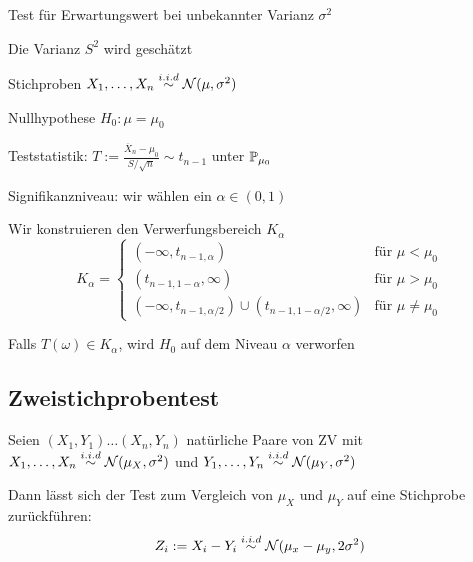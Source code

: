 \begin{definition}[t-Test] Test für Erwartungswert bei unbekannter Varianz \(\sigma^2\)

	Die Varianz \(S^2\) wird geschätzt
	\begin{compactenum}
		\item Stichproben \(X_1, \ldots, X_n \iid \Stdev(\mu,\sigma^2)\)
		\item Nullhypothese \(H_0: \mu = \mu_0\)
		\item Teststatistik: \( T := \frac{\overline{X}_n - \mu_0}{S / \sqrt{n}} \sim t_{n-1}\) unter \(\P_{\mu_0}\)
		\item Signifikanzniveau: wir wählen ein \(\alpha \in (0,1)\)
		\item Wir konstruieren den Verwerfungsbereich \(K_\alpha\)
		\[
			K_\alpha
			=	\left\{\begin{array}{cl}
				(-\infty, t_{n-1,\alpha})                                     & \text{für } \mu < \mu_0    \\
				(t_{n-1,1-\alpha}, \infty)                                    & \text{für } \mu > \mu_0    \\
				(-\infty, t_{n-1,\alpha/2}) \cup (t_{n-1,1-\alpha/2}, \infty) & \text{für } \mu \neq \mu_0
			\end{array}\right.
		\]
		\item Falls \(T(\omega) \in K_\alpha\), wird \(H_0\) auf dem Niveau \(\alpha\) verworfen
	\end{compactenum}
\end{definition}



\subsection{Zweistichprobentest}

\begin{definition}[gepaart] Seien \((X_1, Y_1) \ldots (X_n,Y_n)\) natürliche Paare von ZV
	mit \(X_1, \ldots, X_n \iid \Stdev(\mu_X,\sigma^2)\)
	und \(Y_1, \ldots, Y_n \iid \Stdev(\mu_Y,\sigma^2)\)

	Dann lässt sich der Test zum Vergleich von \(\mu_X\) und \(\mu_Y\) auf eine Stichprobe zurückführen:
	\[	Z_i := X_i - Y_i \iid \Stdev(\mu_x-\mu_y,2\sigma^2) 	\]
\end{definition}


